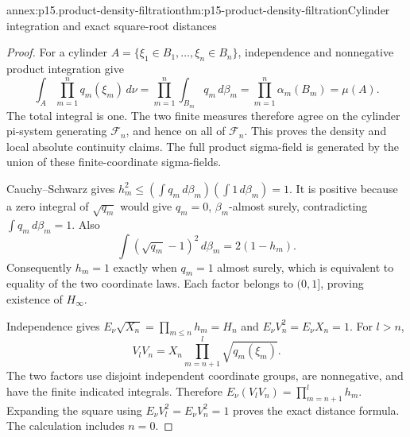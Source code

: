 \begin{annexitem}{annex:p15.product-density-filtration}{thm:p15-product-density-filtration}{Cylinder integration and exact square-root distances}
\begin{proof}
For a cylinder \(A=\{\xi_1\in B_1,\ldots,\xi_n\in B_n\}\),
independence and nonnegative product integration give
\[
 \int_A\prod_{m=1}^nq_m(\xi_m)\,d\nu
       =\prod_{m=1}^n\int_{B_m}q_m\,d\beta_m
       =\prod_{m=1}^n\alpha_m(B_m)=\mu(A).
\]
The total integral is one. The two finite measures therefore agree
on the cylinder pi-system generating \(\mathcal F_n\), and hence on
all of \(\mathcal F_n\). This proves the density and local absolute
continuity claims. The full product sigma-field is generated by the
union of these finite-coordinate sigma-fields.

Cauchy--Schwarz gives
\(h_m^2\leq(\int q_m\,d\beta_m)(\int1\,d\beta_m)=1\).
It is positive because a zero integral of \(\sqrt{q_m}\) would give
\(q_m=0\), \(\beta_m\)-almost surely, contradicting
\(\int q_m\,d\beta_m=1\).
Also
\[
                  \int(\sqrt{q_m}-1)^2\,d\beta_m=2(1-h_m).
\]
Consequently \(h_m=1\) exactly when \(q_m=1\) almost surely,
which is equivalent to equality of the two coordinate laws.
Each factor belongs to \((0,1]\), proving existence of \(H_\infty\).

Independence gives \(E_\nu\sqrt{X_n}=\prod_{m\leq n}h_m=H_n\)
and \(E_\nu V_n^2=E_\nu X_n=1\).
For \(l>n\),
\[
 V_lV_n=X_n\prod_{m=n+1}^l\sqrt{q_m(\xi_m)}.
\]
The two factors use disjoint independent coordinate groups, are
nonnegative, and have the finite indicated integrals. Therefore
\(E_\nu(V_lV_n)=\prod_{m=n+1}^lh_m\).
Expanding the square using \(E_\nu V_l^2=E_\nu V_n^2=1\) proves
the exact distance formula. The calculation includes \(n=0\).
\end{proof}
\end{annexitem}

